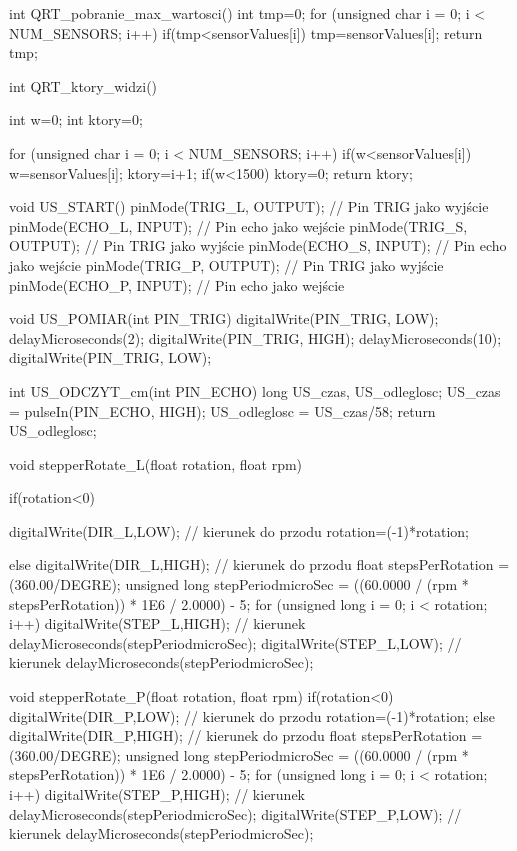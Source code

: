 int QRT_pobranie_max_wartosci(){
  int tmp=0;
  for (unsigned char i = 0; i < NUM_SENSORS; i++)
  {
    if(tmp<sensorValues[i]) tmp=sensorValues[i];
  }
  return tmp;
}

int QRT_ktory_widzi(){
  int w=0;
  int ktory=0;
  
  for (unsigned char i = 0; i < NUM_SENSORS; i++)
  {
    if(w<sensorValues[i])
    {
      w=sensorValues[i];
      ktory=i+1;
    }
    if(w<1500)
    {
      ktory=0;
    }
  }
  return ktory;
}

void US_START(){
  pinMode(TRIG_L, OUTPUT); // Pin TRIG jako wyjście
  pinMode(ECHO_L, INPUT);  // Pin echo jako wejście
  pinMode(TRIG_S, OUTPUT); // Pin TRIG jako wyjście
  pinMode(ECHO_S, INPUT);  // Pin echo jako wejście
  pinMode(TRIG_P, OUTPUT); // Pin TRIG jako wyjście
  pinMode(ECHO_P, INPUT);  // Pin echo jako wejście
}

void US_POMIAR(int PIN_TRIG){
  digitalWrite(PIN_TRIG, LOW);
  delayMicroseconds(2);
  digitalWrite(PIN_TRIG, HIGH);
  delayMicroseconds(10);
  digitalWrite(PIN_TRIG, LOW);
}

int US_ODCZYT_cm(int PIN_ECHO){
  long US_czas, US_odleglosc;
  US_czas = pulseIn(PIN_ECHO, HIGH);
  US_odleglosc = US_czas/58;
  return US_odleglosc;
}

void stepperRotate_L(float rotation, float rpm) {
  if(rotation<0) {
    digitalWrite(DIR_L,LOW); // kierunek do przodu
    rotation=(-1)*rotation;

  }
  else {
    digitalWrite(DIR_L,HIGH); // kierunek do przodu
  }
  float stepsPerRotation = (360.00/DEGRE);
  unsigned long stepPeriodmicroSec = ((60.0000 / (rpm * stepsPerRotation)) * 1E6 / 2.0000) - 5;
  for (unsigned long i = 0; i < rotation; i++) {
    digitalWrite(STEP_L,HIGH); // kierunek
    delayMicroseconds(stepPeriodmicroSec);
    digitalWrite(STEP_L,LOW); // kierunek
    delayMicroseconds(stepPeriodmicroSec);
  }
}

void stepperRotate_P(float rotation, float rpm) {
  if(rotation<0) {
    digitalWrite(DIR_P,LOW); // kierunek do przodu
    rotation=(-1)*rotation;
  }
  else {
    digitalWrite(DIR_P,HIGH); // kierunek do przodu
  }
  float stepsPerRotation = (360.00/DEGRE);
  unsigned long stepPeriodmicroSec = ((60.0000 / (rpm * stepsPerRotation)) * 1E6 / 2.0000) - 5;
  for (unsigned long i = 0; i < rotation; i++) {
    digitalWrite(STEP_P,HIGH); // kierunek
    delayMicroseconds(stepPeriodmicroSec);
    digitalWrite(STEP_P,LOW); // kierunek
    delayMicroseconds(stepPeriodmicroSec);
  }
}

